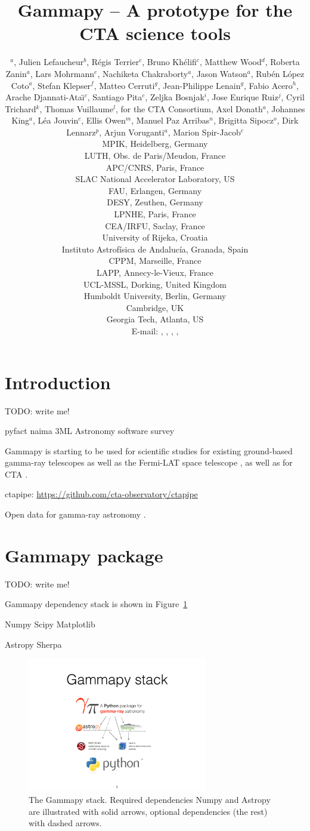 \documentclass{PoS}
\title{Gammapy -- A prototype for the CTA science tools}
\author{
\speaker{Christoph Deil}$^a$,
Julien Lefaucheur$^b$,
R\'egis Terrier$^c$,
Bruno Kh\'elifi$^c$,
Matthew Wood$^d$,
Roberta Zanin$^a$,
Lars Mohrmann$^e$,
Nachiketa Chakraborty$^a$,
Jason Watson$^a$,
Rub\'en L\'opez Coto$^a$,
Stefan Klepser$^f$,
Matteo Cerruti$^g$,
Jean-Philippe Lenain$^g$,
Fabio Acero$^h$,
Arache Djannati-Ata{\"\i}$^c$,
Santiago Pita$^c$,
Zeljka Bosnjak$^i$,
Jose Enrique Ruiz$^j$,
Cyril Trichard$^k$,
Thomas Vuillaume$^l$,
for the CTA Consortium,
Axel Donath$^a$,
Johannes King$^a$,
L\'ea Jouvin$^c$,
Ellis Owen$^m$,
Manuel Paz Arribas$^n$,
Brigitta Sipocz$^o$,
Dirk Lennarz$^p$,
Arjun Voruganti$^a$,
Marion Spir-Jacob$^c$
\\
\llap{$^a$}MPIK, Heidelberg, Germany\\
\llap{$^b$}LUTH, Obs. de Paris/Meudon, France\\
\llap{$^c$}APC/CNRS, Paris, France\\
\llap{$^d$}SLAC National Accelerator Laboratory, US\\
\llap{$^e$}FAU, Erlangen, Germany\\
\llap{$^f$}DESY, Zeuthen, Germany\\
\llap{$^g$}LPNHE, Paris, France\\
\llap{$^h$}CEA/IRFU, Saclay, France\\
\llap{$^i$}University of Rijeka, Croatia\\
\llap{$^j$}Instituto Astrof\'isica de Andaluc\'ia, Granada, Spain\\
\llap{$^k$}CPPM, Marseille, France\\
\llap{$^l$}LAPP, Annecy-le-Vieux, France\\
\llap{$^m$}UCL-MSSL, Dorking, United Kingdom\\
\llap{$^n$}Humboldt University, Berlin, Germany\\
\llap{$^o$}Cambridge, UK\\
\llap{$^p$}Georgia Tech, Atlanta, US\\
E-mail:
\email{Christoph.Deil@mpi-hd.mpg.de},
\email{julien.lefaucheur@obspm.fr},
\email{Roberta.Zanin@mpi-hd.mpg.de},
\email{khelifi@apc.in2p3.fr},
}
\newcommand{\url}[1]{\href{#1}{#1}}
\begin{document}
\section{Introduction}
\label{sec:intro}

TODO: write me!

pyfact \cite{pyfact}
naima \cite{naima}
3ML \cite{3ml}
Astronomy software survey \cite{momcheva2015}

Gammapy is starting to be used for scientific studies for existing ground-based
gamma-ray telescopes \cite{hgps, shells} as well as the Fermi-LAT space
telescope \cite{owen2015}, as well as for CTA \cite{julien, roberta, cyril}.

ctapipe: \url{https://github.com/cta-observatory/ctapipe}

Open data for gamma-ray astronomy \cite{opendata}.

\section{Gammapy package}
\label{sec:gammapy}

TODO: write me!

Gammapy dependency stack is shown in Figure~\ref{fig:stack}

Numpy \cite{numpy}
Scipy \cite{scipy}
Matplotlib \cite{matplotlib}

Astropy \cite{astropy}
Sherpa \cite{sherpa2001, sherpa2009, sherpa2011}

\begin{figure}[t]
\centering
\includegraphics[width=0.7\textwidth]{figures/gammapy-stack}
\caption{
The Gammapy stack. Required dependencies Numpy and Astropy are illustrated with solid arrows, optional dependencies (the rest) with dashed arrows.
}
\label{fig:stack}
\end{figure}
\end{document}
